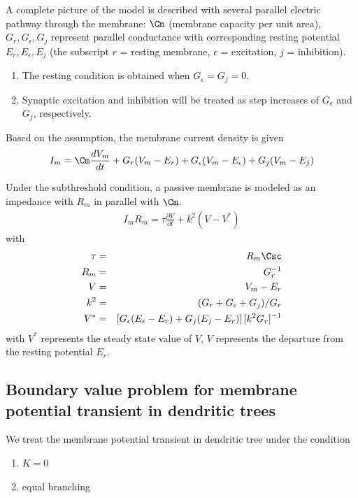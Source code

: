 A complete picture of the model is described with several parallel
electric pathway through the membrane: $\Cm $ (membrane capacity per
unit area), $G_r, G_\epsilon, G_j$ represent parallel conductance with
corresponding resting potential $E_r, E_\epsilon, E_j$ (the subscript
$r$ = resting membrane, $\epsilon$ = excitation, $j$ = inhibition).
\begin{enumerate}
\item The resting condition is obtained when $G_\epsilon = G_j = 0$. 
\item Synaptic excitation and inhibition will be treated as step
  increases of $G_\epsilon$ and $G_j$, respectively. 
\end{enumerate}
Based on the assumption, the membrane current density is given
\begin{eqnarray}
  \label{eq:520}
  I_m = \Cm  \frac{dV_m}{dt} + G_r(V_m-E_r) + G_\epsilon(V_m-E_\epsilon) + G_j(V_m-E_j)
\end{eqnarray}

Under the subthreshold condition, a passive membrane is modeled as an
impedance with $R_m$ in parallel with $\Cm $.
\begin{eqnarray}
  \label{eq:521}
  I_mR_m = \tau \frac{\partial V}{\partial t} + k^2(V-V^*)
\end{eqnarray}
with 
\begin{eqnarray}
  \label{eq:522}
  \tau &=& R_m\Csc  \\
  R_m &=& G_r^{-1}\\
  V &=& V_m-E_r \\
  k^2 &=& (G_r+G_\epsilon+G_j)/G_r \\
  V^* &=& \left[G_\epsilon(E_\epsilon-E_r) + G_j(E_j-E_r)\right] [k^2G_r]^{-1}
\end{eqnarray}
with $V^*$ represents the steady state value of $V$, $V$ represents
the departure from the resting potential $E_r$. 


\subsection[Boundary value problem]{Boundary value problem for
  membrane potential transient in dendritic trees}
\label{sec:bound-value-probl}

We treat the membrane potential transient in dendritic tree under the
condition\cite{rall1962tpp}
\begin{enumerate}
\item $K=0$
\item equal branching
\end{enumerate}

